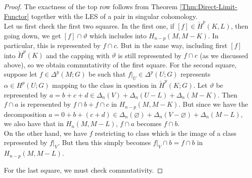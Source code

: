 \documentclass[reqno]{amsart}
\theoremstyle{definition}
\theoremstyle{remark}
\begin{document}
      \begin{proof}
          The exactness of the top row follows
          from Theorem \ref{Thm:Direct-Limit-Functor} together
          with the LES of a pair in singular cohomology.\\

          Let us first check the first two squares.
          In the first one, if
          $\left[ f \right]  \in \check{H}^{p}(K,L)$, then
          going down, we get
          $\left[ f \right] \cap \vartheta$ which includes
          into $H_{n-p}(M, M-K)$. In particular, this
          is represented by
          $f \cap c$. But in the same way, including first
          $\left[ f \right] $ into $\check{H}^{p}(K)$ and
          the capping with $\vartheta$ is still represented
          by $f \cap c$ (as we discussed above),
          so we obtain commutativity of the first
          square.
          For the second square, suppose
          let $f \in \Delta^{p}(M;G)$ be such that
          $f|_{U} \in \Delta^{p}(U;G)$ represents
          $\alpha \in H^{p}(U;G)$ mapping to the class
          in question in $\check{H}^{p}(K;G)$.
          Let $\vartheta$ be represented
          by $a = b+c+d \in \Delta_n (V) + \Delta_n (U-L) + 
          \Delta_n (M - K)$. 
          Then $f \cap a$ is represented by
          $f \cap b + f \cap c$ in $H_{n-p}(M, M-K)$. But since
          we have the decomposition
          $a = 0 + b + (c+d) \in 
          \Delta_n(\varnothing) + \Delta_n (V - \varnothing) + 
          \Delta_n (M-L)$, we also have that
          in $H_n (M, M-L)$, $f \cap a$ becomes
          $f \cap b$.\\
          On the other hand, we have
          $f$ restricting to class which is the image
          of a class represented by $f|_V$. But then
           this simply becomes
           $f|_{V} \cap b = f \cap b$ in
           $H_{n-p}(M, M-L)$.


          For the last square, we must check commutativity.


\end{proof}
\end{document}
